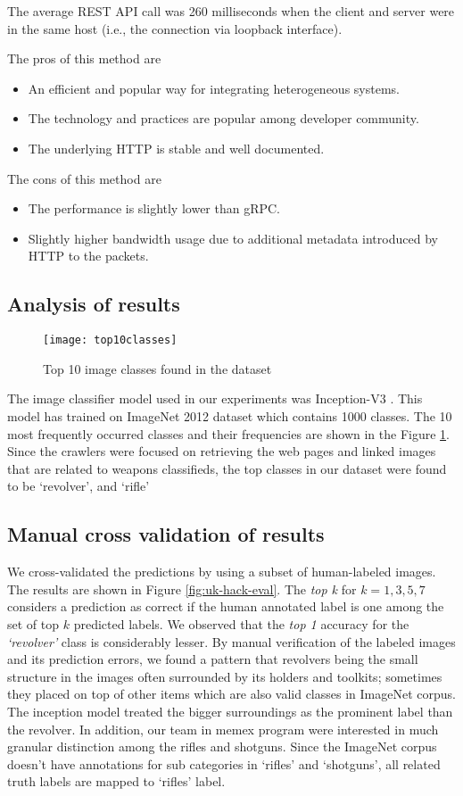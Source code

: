 The average REST API call was 260 milliseconds when the client and server were in the same host (i.e., the connection via loopback interface).

The pros of this method are
\begin{itemize}
	\item An efficient and popular way for integrating heterogeneous systems.
	\item The technology and practices are popular among developer community.
	\item The underlying HTTP is stable and well documented.
\end{itemize}

The cons of this method are
\begin{itemize}
	\item The performance is slightly lower than gRPC.
	\item Slightly higher bandwidth usage due to additional metadata introduced by HTTP to the packets.
\end{itemize}
\fi  %

\subsection{Analysis of results}
\begin{figure}[h]
	\texttt{[image: top10classes]}
	\caption{Top 10 image classes found in the dataset}
	\label{fig:top10ImgClass}
\end{figure}
The image classifier model used in our experiments was Inception-V3 \cite{SzegedyVISW15}. This model has trained on ImageNet 2012 dataset which contains 1000 classes\cite{ILSVRC15}.
The 10 most frequently occurred classes and their frequencies are shown in the Figure \ref{fig:top10ImgClass}. Since the crawlers were focused on retrieving the web pages and linked images that are related to weapons classifieds, the top classes in our dataset were found to be `revolver', and `rifle'

\subsection{Manual cross validation of results}
We cross-validated the predictions by using a subset of human-labeled images. The results are shown in Figure \ref{fig:uk-hack-eval}. The \textit{top k} for $k=1,3,5,7$ considers a prediction as correct if the human annotated label is one among the set of top $k$  predicted labels. We observed that the \textit{top 1} accuracy for the \textit{`revolver'} class is considerably lesser. By manual verification of the labeled images and its prediction errors, we found a pattern that revolvers being the small structure in the images often surrounded by its holders and toolkits; sometimes they placed on top of other items which are also valid classes in ImageNet corpus. The inception model treated the bigger surroundings as the prominent label than the revolver. In addition, our team in memex program were interested in much granular distinction among the rifles and shotguns. Since the ImageNet corpus doesn't have annotations for sub categories in `rifles' and `shotguns', all related truth labels are mapped to `rifles' label. 

